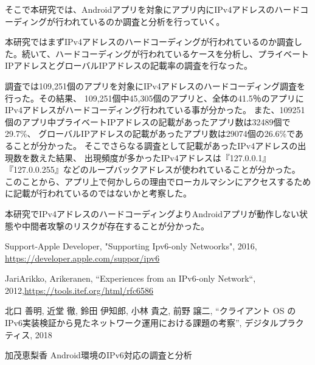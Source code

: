 \documentclass[twocolumn, 10pt, a4paper]{jarticle}
\begin{document}
そこで本研究では、Androidアプリを対象にアプリ内にIPv4アドレスのハードコーディングが行われているのか調査と分析を行っていく。

本研究ではまずIPv4アドレスのハードコーディングが行われているのか調査した。続いて、ハードコーディングが行われているケースを分析し、プライベートIPアドレスとグローバルIPアドレスの記載率の調査を行なった。


調査では109,251個のアプリを対象にIPv4アドレスのハードコーディング調査を行った。その結果、
109,251個中45,305個のアプリと、全体の41.5％のアプリにIPv4アドレスがハードコーディング行われている事が分かった。
また、109251個のアプリ中プライベートIPアドレスの記載があったアプリ数は32489個で29.7\%、
グローバルIPアドレスの記載があったアプリ数は29074個の26.6\%であることが分かった。
そこでさらなる調査として記載があったIPv4アドレスの出現数を数えた結果、
出現頻度が多かったIPv4アドレスは『127.0.0.1』『127.0.0.255』などのループバックアドレスが使われていることが分かった。
このことから、アプリ上で何かしらの理由でローカルマシンにアクセスするために記載が行われているのではないかと考察した。

本研究でIPv4アドレスのハードコーディングよりAndroidアプリが動作しない状態や中間者攻撃のリスクが存在することが分かった。



\begin{thebibliography}{20}

Support-Apple Developer, "Supporting Ipv6-only Netwoorks", 2016, \url{https://developer.apple.com/suppor/ipv6}

JariArikko, Arikeranen, “Experiences from an IPv6-only Network“, 2012,\url{https://tools.itef.org/html/rfc6586}

北口 善明, 近堂 徹, 鈴田 伊知郎, 小林 貴之, 前野 譲二, “クライアント OS の IPv6実装検証から見たネットワーク運用における課題の考察”, デジタルプラクティス, 2018

加茂恵梨香 Android環境のIPv6対応の調査と分析

\end{thebibliography}
\end{document}
